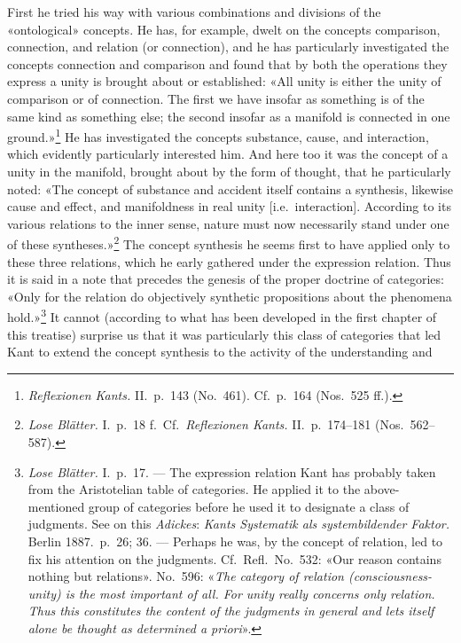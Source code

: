 \documentclass[12pt,a4paper]{article}
\begin{document}
First he tried his way with various combinations and divisions of the
«ontological» concepts. He has, for example, dwelt on the concepts
comparison, connection, and relation (or connection), and he has particularly
investigated the concepts connection and comparison and found that by both
the operations they express a unity is brought about or established: «All
unity is either the unity of comparison or of connection. The first we have
insofar as something is of the same kind as something else; the second
insofar as a manifold is connected in one ground.»\footnote{\textit{Reflexionen
Kants.} II.\ p.\ 143 (No.\ 461). Cf.\ p.\ 164 (Nos.\ 525 ff.).} He has
investigated the concepts substance, cause, and interaction, which evidently
particularly interested him. And here too it was the concept of a unity in
the manifold, brought about by the form of thought, that he particularly
noted: «The concept of substance and accident itself contains a synthesis,
likewise cause and effect, and manifoldness in real unity [i.e.\
interaction]. According to its various relations to the inner sense, nature
must now necessarily stand under one of these syntheses.»\footnote{\textit{Lose
Blätter.} I.\ p.\ 18 f.\ Cf.\ \textit{Reflexionen Kants.} II.\ p.\ 174--181
(Nos.\ 562--587).} The concept synthesis he seems first to have applied only
to these three relations, which he early gathered under the expression
relation. Thus it is said in a note that precedes the genesis of the proper
doctrine of categories: «Only for the relation do objectively synthetic
propositions about the phenomena hold.»\footnote{\textit{Lose Blätter.} I.\
p.\ 17. --- The expression relation Kant has probably taken from the
Aristotelian table of categories. He applied it to the above-mentioned group
of categories before he used it to designate a class of judgments. See on
this \emph{Adickes}: \textit{Kants Systematik als systembildender Faktor.} Berlin
1887.\ p.\ 26; 36. --- Perhaps he was, by the concept of relation, led to fix
his attention on the judgments. Cf.\ Refl.\ No.\ 532: «Our reason contains
nothing but relations». No.\ 596: «\emph{The category of relation
(consciousness-unity) is the most important of all. For unity really
concerns only relation. Thus this constitutes the content of the judgments in
general and lets itself alone be thought as determined a priori}».} It cannot
(according to what has been developed in the first chapter of this treatise)
surprise us that it was particularly this class of categories that led Kant
to extend the concept synthesis to the activity of the understanding and
\end{document}
